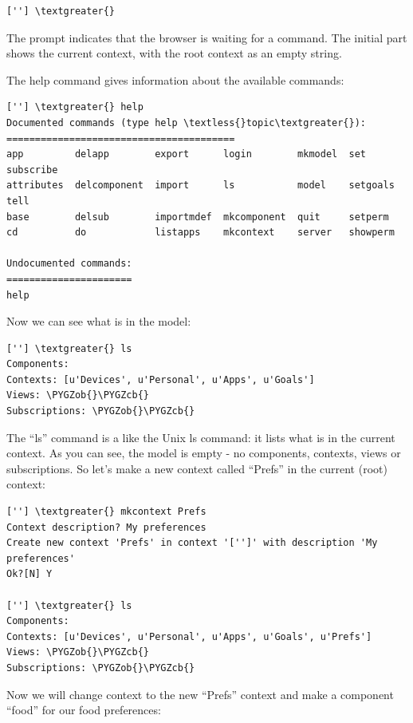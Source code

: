 \documentclass[letterpaper,10pt,english]{sphinxmanual}
\def\PYGZob{\char`\{}
\def\PYGZcb{\char`\}}
\begin{document}
\begin{Verbatim}[commandchars=\\\{\}]
[''] \textgreater{}
\end{Verbatim}

The prompt indicates that the browser is waiting for a command. The
initial part shows the current context, with the root context as an
empty string.

The help command gives information about the available commands:

\begin{Verbatim}[commandchars=\\\{\}]
[''] \textgreater{} help
Documented commands (type help \textless{}topic\textgreater{}):
========================================
app         delapp        export      login        mkmodel  set       subscribe
attributes  delcomponent  import      ls           model    setgoals  tell
base        delsub        importmdef  mkcomponent  quit     setperm
cd          do            listapps    mkcontext    server   showperm

Undocumented commands:
======================
help
\end{Verbatim}

Now we can see what is in the model:

\begin{Verbatim}[commandchars=\\\{\}]
[''] \textgreater{} ls
Components:
Contexts: [u'Devices', u'Personal', u'Apps', u'Goals']
Views: \PYGZob{}\PYGZcb{}
Subscriptions: \PYGZob{}\PYGZcb{}
\end{Verbatim}

The ``ls'' command is a like the Unix ls command: it lists what is in the
current context.
As you can see, the model is empty - no components, contexts, views or
subscriptions.
So let's make a new context called ``Prefs'' in the current (root) context:

\begin{Verbatim}[commandchars=\\\{\}]
[''] \textgreater{} mkcontext Prefs
Context description? My preferences
Create new context 'Prefs' in context '['']' with description 'My preferences'
Ok?[N] Y

[''] \textgreater{} ls
Components:
Contexts: [u'Devices', u'Personal', u'Apps', u'Goals', u'Prefs']
Views: \PYGZob{}\PYGZcb{}
Subscriptions: \PYGZob{}\PYGZcb{}
\end{Verbatim}

Now we will change context to the new ``Prefs'' context and make a
component ``food'' for our food preferences:
\end{document}
